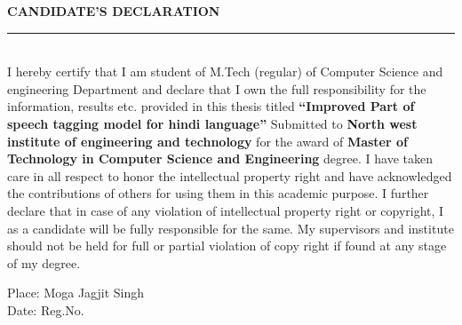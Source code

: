 \documentclass[12pt,a4paper,oneside]{memoir}
\newenvironment{candidate}%
    {\large\bfseries\centering CANDIDATE'S DECLARATION%
    \par\medskip\normalfont\normalsize}%
    {}%
\begin{document}
\newpage
\begin{candidate}
\noindent\rule{17cm}{1.0 pt} \\

\justify
I hereby certify that I am student of M.Tech (regular) of Computer Science and engineering Department and declare that I own the full responsibility for the information, results etc. provided in this thesis titled \textbf{“Improved Part of speech tagging model for hindi language”} Submitted to \textbf{North west institute of engineering and technology } for the award of \textbf{Master of Technology in Computer Science and Engineering} degree. I have taken care in all respect to honor the intellectual property right and have acknowledged the contributions of others for using them in this academic purpose. I further declare that in case of any violation of intellectual property right or copyright, I as a candidate will be fully responsible for the same. My supervisors and institute should not be held for full or partial violation of copy right if found at any stage of my degree.
\vspace{3 cm}

\noindent Place:  Moga   \hfill Jagjit Singh \\
\noindent Date: \hfill Reg.No. 
\end{candidate}
\newpage
\end{document}
